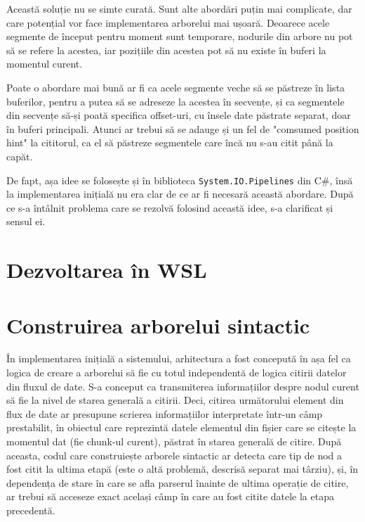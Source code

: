 \documentclass[a4paper,12pt]{report}
\begin{document}
Această soluție nu se simte curată.
Sunt alte abordări puțin mai complicate, dar care potențial vor face implementarea arborelui mai ușoară.
Deoarece acele segmente de început pentru moment sunt temporare,
nodurile din arbore nu pot să se refere la acestea, iar pozițiile din acestea pot să nu existe în buferi la momentul curent.

Poate o abordare mai bună ar fi ca acele segmente veche să se păstreze în lista buferilor,
pentru a putea să se adreseze la acestea în secvențe,
și ca segmentele din secvențe să-și poată specifica offset-uri,
cu însele date păstrate separat, doar în buferi principali.
Atunci ar trebui să se adauge și un fel de "comsumed position hint" la cititorul,
ca el să păstreze segmentele care încă nu s-au citit până la capăt.

De fapt, așa idee se folosește și în biblioteca \texttt{System.IO.Pipelines} din C\#,
însă la implementarea inițială nu era clar de ce ar fi necesară această abordare.
După ce s-a întâlnit problema care se rezolvă folosind această idee, s-a clarificat și sensul ei.



\chapter{Dezvoltarea în WSL}


\chapter{Construirea arborelui sintactic}

În implementarea inițială a sistemului, arhitectura a fost concepută în așa fel ca
logica de creare a arborelui să fie cu totul independentă de logica citirii datelor din fluxul de date.
S-a conceput ca transmiterea informațiilor despre nodul curent să fie la nivel de starea generală a citirii.
Deci, citirea următorului element din flux de date ar presupune scrierea informațiilor interpretate
într-un câmp prestabilit, în obiectul care reprezintă datele elementul
din fișier care se citește la momentul dat (fie chunk-ul curent), păstrat în starea generală de citire.
După aceasta, codul care construiește arborele sintactic ar detecta care tip de nod a fost citit la ultima etapă
(este o altă problemă, descrisă separat mai târziu),
și, în dependența de stare în care se afla parserul înainte de ultima operație de citire,
ar trebui să acceseze exact același câmp în care au fost citite datele la etapa precedentă.
\end{document}
